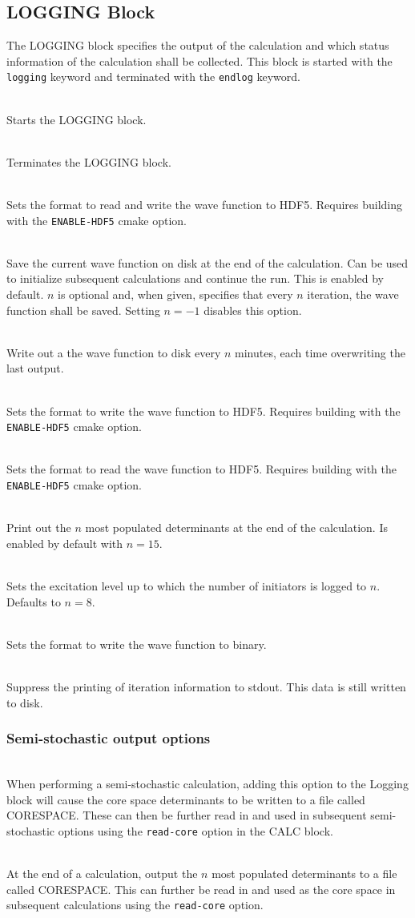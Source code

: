 \documentclass[a4paper,notitlepage,dvipsnames]{scrreprt}
\newcommand\codeitem[1]{\needspace{1.5\baselineskip}\item[\textnormal{\ttfamily #1 \nopagebreak}] \hfill \\ \nopagebreak}
\begin{document}
    \subsection{LOGGING Block}
    The LOGGING block specifies the output of the calculation and which
    status information of the calculation shall be collected. This block is
    started with the \texttt{logging} keyword and terminated with the
    \texttt{endlog} keyword.
    \begin{description}
      \codeitem{\textcolor{oblue}{logging}}
      Starts the LOGGING block.
      \codeitem{\textcolor{oblue}{endlog}}
      Terminates the LOGGING block.
      \codeitem{\textcolor{oblue}{hdf5-popsfile}}
      Sets the format to read and write the wave function to HDF5. Requires building
      with the \texttt{ENABLE-HDF5} cmake option.
      \codeitem{popsfile $n$}
      Save the current wave function on disk at the end of the
      calculation. Can be used to initialize subsequent calculations and
      continue the run. This is enabled by default. $n$ is optional and, when
      given, specifies that every $n$ iteration, the wave function shall be
      saved. Setting $n=-1$ disables this option.
      \codeitem{popsFileTimer $n$}
      Write out a the wave function to disk every $n$ minutes, each time
      overwriting the last output.
      \codeitem{hdf5-pops-write}
      Sets the format to write the wave function to HDF5. Requires building
      with the \texttt{ENABLE-HDF5} cmake option.
      \codeitem{hdf5-pops-read}
      Sets the format to read the wave function to HDF5. Requires building
      with the \texttt{ENABLE-HDF5} cmake option. 
      \codeitem{highlyPopWrite $n$}
      Print out the $n$ most populated determinants at the end of the
      calculation. Is enabled by default with $n=15$.
      \codeitem{inits-exlvl-write $n$}
      Sets the excitation level up to which the number of initiators is logged
      to $n$. Defaults to $n=8$.
      \codeitem{binarypops}
      Sets the format to write the wave function to binary.
      \codeitem{nomcoutput}
      Suppress the printing of iteration information to stdout. This data is
      still written to disk.
    \end{description}
    \subsubsection{Semi-stochastic output options}
    \begin{description}
      \codeitem{write-core}
      When performing a semi-stochastic calculation, adding this option
      to the Logging block will cause the core space determinants to be
      written to a file called CORESPACE. These can then be further read
      in and used in subsequent semi-stochastic options using the
      \texttt{read-core} option in the CALC block.
      \codeitem{write-most-pop-core-end $n$}
      At the end of a calculation, output the $n$ most populated
      determinants to a file called CORESPACE. This can further be read
      in and used as the core space in subsequent calculations using the
      \texttt{read-core} option.
    \end{description}
\end{document}
